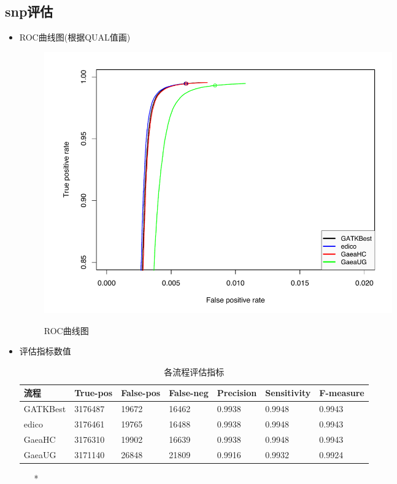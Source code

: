 \documentclass[UTF8,10pt,a4paper]{ctexart}
\begin{document}
\subsection{snp评估}
\begin{itemize}
\item ROC曲线图(根据QUAL值画)\\

\begin{figure}[htbp]
\begin{center}
\label{snp}
\includegraphics[width=15cm]{snp.pdf}
\caption{ROC曲线图}
\end{center}
\end{figure}
\item 评估指标数值\\
\begin{table}[htp]
\newcommand{\tabincell}[2]{\begin{tabular}{@{}#1@{}}#2\end{tabular}}
{\small
\caption{各流程评估指标}
\begin{center}
\begin{tabular}{p{2cm}|p{2cm}|p{2cm}|p{2cm}|p{2cm}|p{2cm}|p{2cm}}
\hline
流程 & True-pos & False-pos & False-neg & Precision & Sensitivity & F-measure\\
\hline
GATKBest & 3176487 & 19672 & 16462 & 0.9938 & 0.9948 & 0.9943 \\
edico & 3176461 & 19765 & 16488 & 0.9938 & 0.9948 & 0.9943 \\
GaeaHC& 3176310 & 19902 & 16639 & 0.9938 & 0.9948 & 0.9943 \\
GaeaUG & 3171140 & 26848 & 21809 & 0.9916 & 0.9932  & 0.9924\\
\hline
\end{tabular}
\end{center}
\label{default}
}
\begin{itemize}
\item[*] {}
\end{itemize}


\end{table}
\end{itemize}
\end{document}

